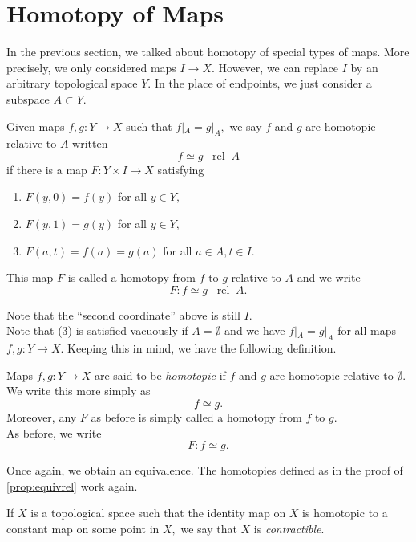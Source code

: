 \documentclass[12pt]{article}
\newcommand{\rel}{\;\;\operatorname{rel}\;}
\begin{document}
\section{Homotopy of Maps}
%
In the previous section, we talked about homotopy of special types of maps. More precisely, we only considered maps $I \to X.$ However, we can replace $I$ by an arbitrary topological space $Y.$ In the place of endpoints, we just consider a subspace $A \subset Y.$
\begin{defn}
	Given maps $f, g:Y \to X$ such that $f|_A = g|_A,$ we say $f$ and $g$ are homotopic relative to $A$ written
	\begin{equation*} 
		f \simeq g \rel A
	\end{equation*}
	if there is a map $F:Y \times I \to X$ satisfying
	\begin{enumerate}
		\item $F(y, 0) = f(y)$ for all $y \in Y,$
		\item $F(y, 1) = g(y)$ for all $y \in Y,$
		\item $F(a, t) = f(a) = g(a)$ for all $a \in A, t \in I.$
	\end{enumerate}
	This map $F$ is called a homotopy from $f$ to $g$ relative to $A$ and we write
	\begin{equation*} 
		F:f\simeq g \rel A.
	\end{equation*}
\end{defn}
Note that the ``second coordinate'' above is still $I.$\\
Note that (3) is satisfied vacuously if $A = \emptyset$ and we have $f|_A = g|_A$ for all maps $f, g : Y \to X.$ Keeping this in mind, we have the following definition.
\begin{defn}[Homotopy]
	Maps $f, g:Y \to X$ are said to be \emph{homotopic} if $f$ and $g$ are homotopic relative to $\emptyset.$\\
	We write this more simply as
	\begin{equation*} 
		f \simeq g.
	\end{equation*}
	Moreover, any $F$ as before is simply called a homotopy from $f$ to $g.$\\
	As before, we write
	\begin{equation*} 
		F:f\simeq g.
	\end{equation*}
\end{defn}

Once again, we obtain an equivalence. The homotopies defined as in the proof of \cref{prop:equivrel} work again.
\begin{defn} \label{def:contrac}
	If $X$ is a topological space such that the identity map on $X$ is homotopic to a constant map on some point in $X,$ we say that $X$ is \emph{contractible}.
\end{defn}
\end{document}
